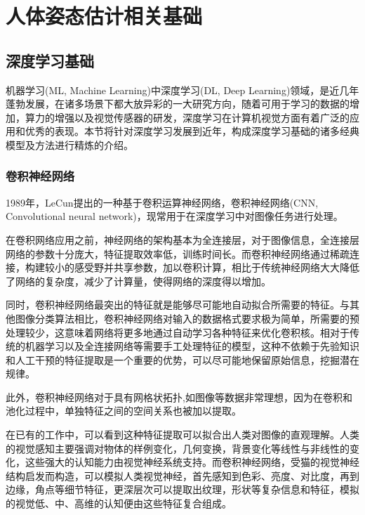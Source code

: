 
\chapter{人体姿态估计相关基础}


\section{深度学习基础}


机器学习(ML, Machine Learning)中深度学习(DL, Deep Learning)领域，是近几年蓬勃发展，在诸多场景下都大放异彩的一大研究方向，随着可用于学习的数据的增加，算力的增强以及视觉传感器的研发，深度学习在计算机视觉方面有着广泛的应用和优秀的表现。本节将针对深度学习发展到近年，构成深度学习基础的诸多经典模型及方法进行精炼的介绍。



\subsection{卷积神经网络}{}

1989年，LeCun提出的一种基于卷积运算神经网络，卷积神经网络(CNN, Convolutional neural network)，现常用于在深度学习中对图像任务进行处理。

在卷积网络应用之前，神经网络的架构基本为全连接层，对于图像信息，全连接层网络的参数十分庞大，特征提取效率低，训练时间长。而卷积神经网络通过稀疏连接，构建较小的感受野并共享参数，加以卷积计算，相比于传统神经网络大大降低了网络的复杂度，减少了计算量，使得网络的深度得以增加。

同时，卷积神经网络最突出的特征就是能够尽可能地自动拟合所需要的特征。与其他图像分类算法相比，卷积神经网络对输入的数据格式要求极为简单，所需要的预处理较少，这意味着网络将更多地通过自动学习各种特征来优化卷积核。相对于传统的机器学习以及全连接网络等需要手工处理特征的模型，这种不依赖于先验知识和人工干预的特征提取是一个重要的优势，可以尽可能地保留原始信息，挖掘潜在规律。

此外，卷积神经网络对于具有网格状拓扑,如图像等数据非常理想，因为在卷积和池化过程中，单独特征之间的空间关系也被加以提取。

在已有的工作中，可以看到这种特征提取可以拟合出人类对图像的直观理解。人类的视觉感知主要强调对物体的样例变化，几何变换，背景变化等线性与非线性的变化，这些强大的认知能力由视觉神经系统支持。而卷积神经网络，受猫的视觉神经结构启发而构造，可以模拟人类视觉神经，首先感知到色彩、亮度、对比度，再到边缘，角点等细节特征，更深层次可以提取出纹理，形状等复杂信息和特征，模拟的视觉低、中、高维的认知便由这些特征复合组成。

